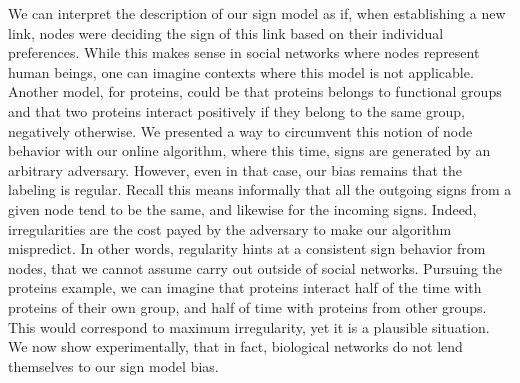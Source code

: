 We can interpret the description of our sign model as if, when establishing a new link, nodes were
deciding the sign of this link based on their individual preferences. While this makes sense in
social networks where nodes represent human beings, one can imagine contexts where this model is not
applicable. Another model, \eg{} for proteins, could be that proteins belongs to functional groups
and that two proteins interact positively if they belong to the same group, negatively otherwise.
We presented a way to circumvent this notion of node behavior with our online algorithm, where this
time, signs are generated by an arbitrary adversary. However, even in that case, our bias remains
that the labeling is regular. Recall this means informally that all the outgoing signs from a given
node tend to be the same, and likewise for the incoming signs. Indeed, irregularities are the cost
payed by the adversary to make our algorithm mispredict. In other words, regularity hints at a
consistent sign behavior from nodes, that we cannot assume carry out outside of social networks.
Pursuing the proteins example, we can imagine that proteins interact half of the time with proteins
of their own group, and half of time with proteins from other groups. This would correspond to
maximum irregularity, yet it is a plausible situation. We now show experimentally, that in fact,
biological networks do not lend themselves to our sign model bias.


